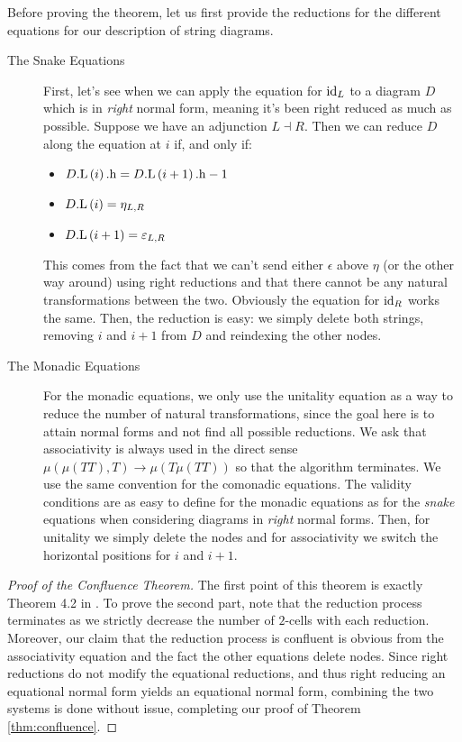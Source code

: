 Before proving the theorem, let us first provide the reductions for the different
equations for our description of string diagrams.
\begin{description}
	\item[The Snake Equations]
	      First, let's see when we can apply the equation for $\mathrm{id}_{L}$ to a
	      diagram $D$ which is in \emph{right} normal form, meaning it's been
	      right reduced as much as possible.
	      Suppose we have an adjunction $L \dashv R$.
	      Then we can reduce $D$ along the equation at $i$ if, and only if:
	      \begin{itemize}
		      \item $D\mathrm{.L}\left(i\right)\mathrm{.h} = D\mathrm{.L}\left(i + 1\right)\mathrm{.h} - 1$
		      \item $D\mathrm{.L}\left(i\right) = \eta_{L, R}$
		      \item $D\mathrm{.L}\left(i + 1\right) = \varepsilon_{L, R}$
	      \end{itemize}
	      This comes from the fact that we can't send either $\epsilon$
	      above $\eta$ (or the other way around) using right reductions and
	      that there cannot be any natural transformations between the two.
	      Obviously the equation for $\mathrm{id}_{R}$ works the same.
	      Then, the reduction is easy: we simply delete both strings,
	      removing $i$ and $i + 1$ from $D$ and reindexing the other nodes.
	\item[The Monadic Equations] For the monadic equations, we only use
	      the unitality equation as a way to reduce the number of natural
	      transformations, since the goal here is to attain normal forms
	      and not find all possible reductions.
	      We ask that associativity is always used in the direct
	      sense $\mu\left( \mu\left( TT \right),T \right) \to \mu\left(
		      T\mu\left( TT \right) \right)$ so that the algorithm terminates.
	      We use the same convention for the comonadic equations.
	      The validity conditions are as easy to define for the monadic
	      equations as for the \emph{snake} equations when considering
	      diagrams in \emph{right} normal forms.
	      Then, for unitality we simply delete the nodes
	      and for associativity we switch the horizontal
	      positions for $i$ and $i + 1$.
\end{description}

\begin{proof}[Proof of the Confluence Theorem]
	The first point of this theorem is exactly Theorem 4.2
	in \cite{delpeuchNormalizationPlanarString2022}.
	To prove the second part, note that the reduction process terminates as
	we strictly decrease the number of $2$-cells with each reduction.
	Moreover, our claim that the reduction process is confluent is obvious
	from the associativity equation and the fact the other
	equations delete nodes.
	Since right reductions do not modify the equational reductions, and thus
	right reducing an equational normal form yields an equational normal form,
	combining the two systems is done without issue, completing our proof of
	Theorem \ref{thm:confluence}.
\end{proof}


